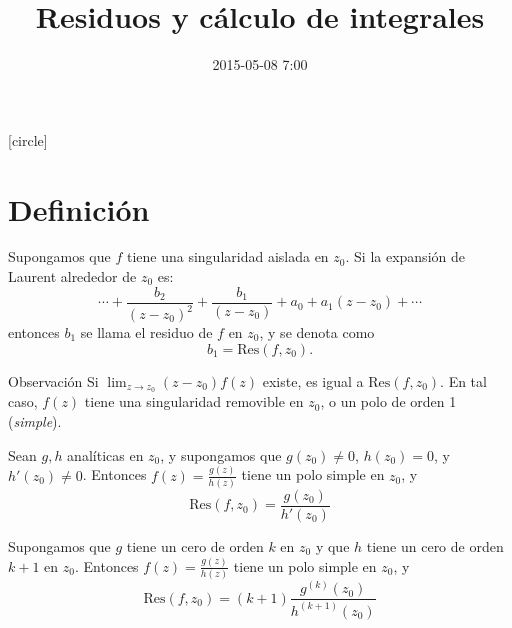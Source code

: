 \documentclass[spanish,presentation]{beamer}
\date{2015-05-08 7:00}
\title{Residuos y cálculo de integrales}
\begin{document}
\maketitle
{}
[circle]

\tableofcontents

\section{Definición}
\label{sec:orgheadline1}

\begin{frame}[label=sec-1-1]{}
\begin{definition}[Residuo]
Supongamos que \(f\) tiene una singularidad aislada en
\(z_{0}\). Si la expansión de Laurent alrededor de \(z_{0}\) es:
\begin{displaymath}
\cdots+\frac{b_{2}}{(z-z_{0})^{2}}+\frac{b_{1}}{(z-z_{0})}+a_{0}+a_{1}(z-z_{0})+\cdots
\end{displaymath}
entonces \(b_{1}\) se llama el \alert{residuo} de \(f\) en \(z_{0}\), y
se denota como
\begin{displaymath}
b_{1}=\mathrm{Res}(f,z_{0}).
\end{displaymath}
\end{definition}

\begin{block}{Observación}
Si \(\lim_{z\to z_{0}}(z-z_{0})f(z)\) existe, es igual a
\(\mathrm{Res}(f,z_{0})\). En tal caso, \(f(z)\) tiene una
singularidad removible en \(z_{0}\), o un polo de orden 1
(\emph{simple}). 
\end{block}
\end{frame}

\begin{frame}[label=sec-1-2]{}
\begin{theorem}
Sean \(g,h\) analíticas en \(z_{0}\), y supongamos que
\(g(z_{0})\ne 0\), \(h(z_{0})=0\), y \(h'(z_{0})\ne 0\). Entonces
\(f(z)=\frac{g(z)}{h(z)}\) tiene un polo simple en \(z_{0}\), y
\begin{displaymath}
\mathrm{Res}(f,z_{0})=\frac{g(z_{0})}{h'(z_{0})}
\end{displaymath}
\end{theorem}

\begin{theorem}[Generalización]
Supongamos que \(g\) tiene un cero de orden \(k\) en \(z_{0}\) y
que \(h\) tiene un cero de orden \(k+1\) en \(z_{0}\). Entonces
\(f(z)=\frac{g(z)}{h(z)}\) tiene un polo simple en \(z_{0}\), y
\begin{displaymath}
\mathrm{Res}(f,z_{0})=(k+1)\frac{g^{(k)}(z_{0})}{h^{(k+1)}(z_{0})}
\end{displaymath}
\end{theorem}
\end{frame}
\end{document}
